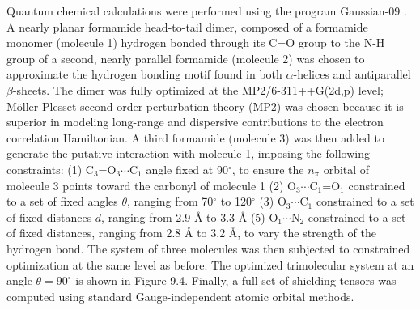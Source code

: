 \begin{doublespace}
Quantum chemical calculations were performed using the program Gaussian-09
\cite{gaussian2009}. A nearly planar formamide head-to-tail dimer,
composed of a formamide monomer (molecule 1) hydrogen bonded through its C=O
group to the N-H group of a second, nearly parallel formamide (molecule 2) was
chosen to approximate the hydrogen bonding motif found in both $\alpha$-helices
and antiparallel $\beta$-sheets. The dimer was fully optimized at the
MP2/6-311++G(2d,p) level; M\"{o}ller-Plesset second order perturbation theory
(MP2) was chosen because it is superior in modeling long-range and dispersive
contributions to the electron correlation Hamiltonian. A third formamide
(molecule 3) was then added to generate the putative \npistar{} interaction
with molecule 1, imposing the following constraints:
(1) C$_3$=O$_3\cdots$C$_1$ angle fixed at 90$^\circ$, to ensure the $n_\pi$
orbital of molecule 3 points toward the carbonyl of molecule
1 (2) O$_3\cdots$C$_1$=O$_1$ constrained to a set of fixed angles $\theta$,
ranging from 70$^\circ$ to 120$^\circ$ (3) O$_3\cdots$C$_1$ constrained to
a set of fixed distances $d$, ranging from 2.9 \r{A} to 3.3 \r{A}
(5) O$_1\cdots$N$_2$ constrained to a set of fixed distances, ranging
from 2.8 \r{A} to 3.2 \r{A}, to vary the strength of the hydrogen bond. The
system of three molecules was then subjected to constrained optimization at the
same level as before. The optimized trimolecular system at an angle
$\theta = 90^\circ$ is shown in Figure 9.4. Finally, a full set of shielding
tensors was computed using standard Gauge-independent atomic orbital methods.
\end{doublespace}

